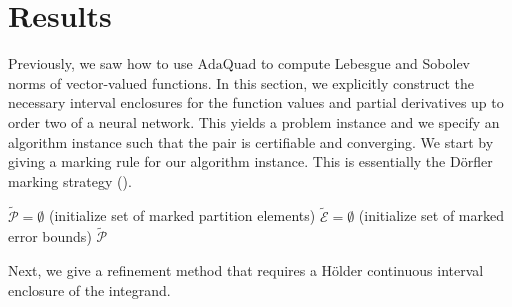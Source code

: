 \documentclass[a4paper, 11pt]{article}
\begin{document}
	\section{Results}\label{sec: results}
	
	Previously, we saw how to use $\mathrm{AdaQuad}$ to compute Lebesgue and Sobolev norms of vector-valued functions. In this section, we explicitly construct the necessary interval enclosures for the function values and partial derivatives up to order two of a neural network. This yields a problem instance and we specify an algorithm instance such that the pair is certifiable and converging. We start by giving a marking rule for our algorithm instance. This is essentially the Dörfler marking strategy (\cite{dorfler1996convergent}).
	
	\vspace{1em}
	\begin{algorithm}[H]\label{alg: dörfler strategy}
		\LinesNotNumbered
		\DontPrintSemicolon
		\caption{$\mathrm{D\ddot{o}rfler}_\theta(\mathcal{E})$}
		\BlankLine
		
		$\widetilde{\mathcal{P}} = \emptyset$ \quad (initialize set of marked partition elements)\;
		$\widetilde{\mathcal{E}} = \emptyset$ \quad (initialize set of marked error bounds)\;
		\Return $\widetilde{\mathcal{P}}$\;
	\end{algorithm}
	\vspace{1em}
	
	Next, we give a refinement method {that} requires a Hölder continuous interval enclosure of the integrand.
	
\end{document}
